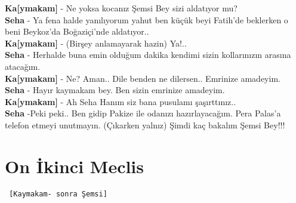 \documentclass[]{book}
\begin{document}
\textbf{Ka{[}ymakam{]}} - Ne yoksa kocanız Şemsi Bey sizi aldatıyor mu?\\
\textbf{Seha} - Ya fena halde yanılıyorum yahut ben küçük beyi Fatih'de beklerken o beni Beykoz'da Boğaziçi'nde aldatıyor..\\
\textbf{Ka{[}ymakam{]}} - (Birşey anlamayarak hazin) Ya!..\\
\textbf{Seha} - Herhalde buna emin olduğum dakika kendimi sizin kollarınızın arasına atacağım.\\
\textbf{Ka{[}ymakam{]}} - Ne? Aman.. Dile benden ne dilersen.. Emrinize amadeyim.\\
\textbf{Seha} - Hayır kaymakam bey. Ben sizin emrinize amadeyim.\\
\textbf{Ka{[}ymakam{]}} - Ah Seha Hanım siz bana pusulamı şaşırttınız..\\
\textbf{Seha} -Peki peki.. Ben gidip Pakize ile odanızı hazırlayacağım. Pera Palas'a telefon etmeyi unutmayın. (Çıkarken yalnız) Şimdi kaç bakalım Şemsi Bey!!!\\

\hypertarget{on-ikinci-meclis-1}{%
\section{On İkinci Meclis}\label{on-ikinci-meclis-1}}

\begin{verbatim}
 [Kaymakam- sonra Şemsi]
\end{verbatim}
\end{document}
